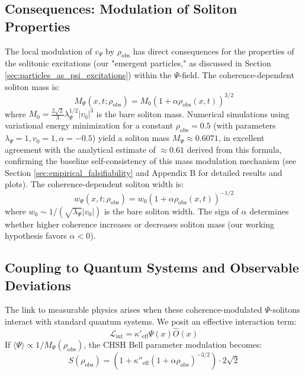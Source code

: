 \documentclass{report}
\begin{document}
    \subsection{Consequences: Modulation of Soliton Properties}
    \label{subsec:consequences_soliton_properties}
    The local modulation of $v_{\Psi}$ by $\rho_{\text{obs}}$ has direct consequences for the properties of the solitonic
    excitations (our "emergent particles," as discussed in Section \ref{sec:particles_as_psi_excitations}) within the $\Psi$-field. The
    coherence-dependent soliton mass is:
    \begin{equation}
        M_{\Psi}(x, t; \rho_{\text{obs}}) = M_0 (1 + \alpha\rho_{\text{obs}}(x, t))^{3/2}
    \end{equation}
    where $M_0 = \frac{2\sqrt{2}}{3}\lambda_{\Psi}^{1/2}|v_0|^3$ is the bare soliton mass. Numerical simulations using variational
    energy minimization for a constant $\rho_{\text{obs}} = 0.5$ (with parameters $\lambda_{\Psi} = 1, v_0 = 1, \alpha = -0.5$) yield a
    soliton mass $M_{\Psi} \approx 0.6071$, in excellent agreement with the analytical estimate of $\approx 0.61$ derived
    from this formula, confirming the baseline self-consistency of this mass modulation mechanism
    (see Section \ref{sec:empirical_falsifiability} and Appendix B for detailed results and plots). The coherence-dependent
    soliton width is:
    \begin{equation}
        w_{\Psi}(x, t; \rho_{\text{obs}}) = w_0 (1 + \alpha\rho_{\text{obs}}(x, t))^{-1/2}
    \end{equation}
    where $w_0 \sim 1/(\sqrt{\lambda_{\Psi}}|v_0|)$ is the bare soliton width. The sign of $\alpha$ determines whether higher
    coherence increases or decreases soliton mass (our working hypothesis favors $\alpha < 0$).

    \subsection{Coupling to Quantum Systems and Observable Deviations}
    \label{subsec:coupling_quantum_observable_deviations}
    The link to measurable physics arises when these coherence-modulated $\Psi$-solitons interact with
    standard quantum systems. We posit an effective interaction term:
    \begin{equation}
        \mathcal{L}_{\text{int}} = \kappa'_{\text{eff}}\Psi(x)\hat{O}(x) %
    \end{equation}
    If $\langle\Psi\rangle \propto 1/M_{\Psi}(\rho_{\text{obs}})$, the CHSH Bell parameter modulation becomes:
    \begin{equation}
        S(\rho_{\text{obs}}) = \left(1 + \kappa''_{\text{eff}}(1 + \alpha\rho_{\text{obs}})^{-3/2}\right) \cdot 2\sqrt{2} %
    \end{equation}
\end{document}
